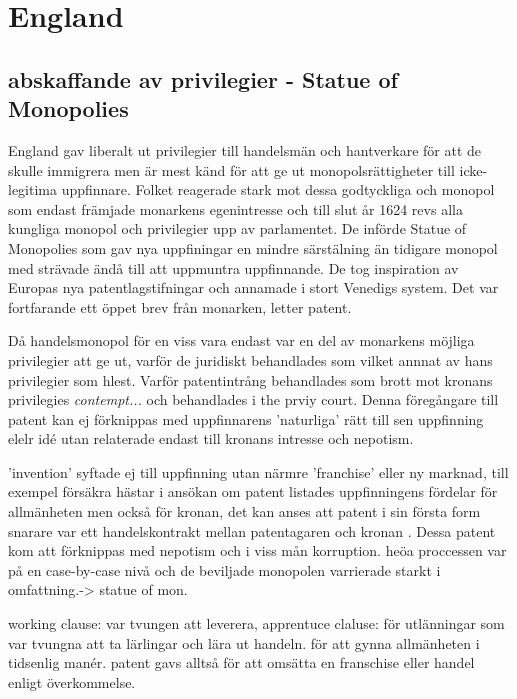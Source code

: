 \section{England} %
\label{sec:england}

\subsection{abskaffande av privilegier - Statue of Monopolies} %
\label{sub:abskaffande_av_privilegier_statue_of_monopolies}



England gav liberalt ut privilegier till handelsmän och hantverkare för att de skulle immigrera men är mest känd för att ge ut monopolsrättigheter till icke-legitima uppfinnare. 
Folket reagerade stark mot dessa godtyckliga och monopol som endast främjade monarkens egenintresse och till slut år 1624 revs alla kungliga monopol och privilegier upp av parlamentet. 
De införde Statue of Monopolies som gav nya uppfiningar en mindre särstälning än tidigare monopol med strävade ändå till att uppmuntra uppfinnande. 
De tog inspiration av Europas nya patentlagstifningar och annamade i stort Venedigs system. 
Det var fortfarande ett öppet brev från monarken, letter patent.

Då handelsmonopol för en viss vara endast var en del av monarkens möjliga privilegier att ge ut, varför de  juridiskt behandlades som vilket annnat av hans privilegier som hlest. Varför patentintrång behandlades som brott mot kronans privilegies \emph{contempt...} och behandlades i the prviy court. 
Denna föregångare till patent kan ej förknippas med uppfinnarens 'naturliga' rätt till sen uppfinning elelr idé utan relaterade endast till kronans intresse och nepotism. \cite{obracha}

'invention' syftade ej till uppfinning utan närmre 'franchise' eller ny marknad, till exempel 
försäkra hästar
i ansökan om patent listades uppfinningens fördelar för allmänheten men också för kronan, det kan anses att patent i sin första form snarare var ett handelskontrakt mellan patentagaren och kronan \cite{obracha}.
Dessa patent kom att förknippas med nepotism och i viss mån korruption. heöa proccessen var på en case-by-case nivå och de beviljade monopolen varrierade starkt i omfattning.-> statue of mon.

working clause: var tvungen att leverera, apprentuce claluse: för utlänningar som var tvungna att ta lärlingar och lära ut handeln. för att gynna allmänheten i tidsenlig manér.
patent gavs alltså för att omsätta en franschise eller handel enligt överkommelse.


